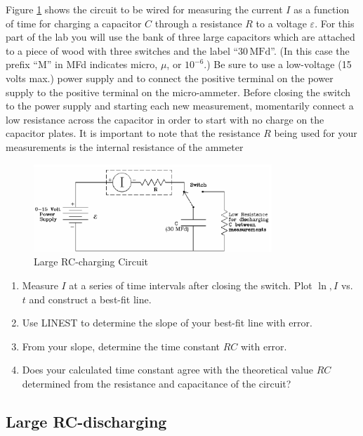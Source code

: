 Figure \ref{fig:largerccharge} shows the circuit to be wired for measuring the current $I$ as a function of time for charging a capacitor $C$ through a resistance $R$ to a voltage $\varepsilon$. For this part of the lab you will use the bank of three large capacitors which are attached to a piece of wood with three switches and the label ``$30\,\mathrm{MFd}$''. (In this case the prefix ``M'' in MFd indicates micro, $\mu$, or $10^{-6}$.) Be sure to use a low-voltage (15 volts max.) power supply and to connect the positive terminal on the power supply to the positive terminal on the micro-ammeter. Before closing the switch to the power supply and starting each new measurement, momentarily connect a low resistance across the capacitor in order to start with no charge on the capacitor plates. It is important to note that the resistance $R$ being used for your measurements is the internal resistance of the ammeter\myskip
\begin{figure}[h]
   \begin{center}
       \includegraphics[width=0.8\textwidth]{./Exp3/pic/image6.png}
   \end{center}
   \caption{Large RC-charging Circuit}
   \label{fig:largerccharge}
\end{figure}

\begin{enumerate}
  \item Measure $I$ at a series of time intervals after closing the switch. Plot $\ln,I$ vs. $t$ and construct a best-fit line.
  \item Use LINEST to determine the slope of your best-fit line with error.
  \item From your slope, determine the time constant $RC$ with error.
  \item Does your calculated time constant agree with the theoretical value $RC$ determined from the resistance and capacitance of the circuit?
\end{enumerate}

\subsection{Large RC-discharging}

